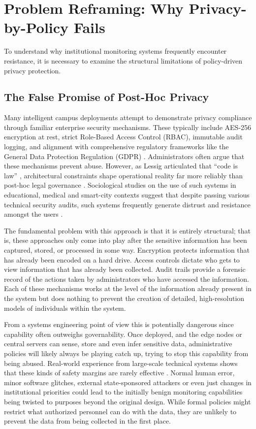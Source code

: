 \documentclass[conference]{IEEEtran}
\begin{document}
\section{Problem Reframing: Why Privacy-by-Policy Fails}

To understand why institutional monitoring systems frequently encounter resistance, it is necessary to examine the structural limitations of policy-driven privacy protection.

\subsection{The False Promise of Post-Hoc Privacy}
Many intelligent campus deployments attempt to demonstrate privacy compliance through familiar enterprise security mechanisms. These typically include AES-256 encryption at rest, strict Role-Based Access Control (RBAC), immutable audit logging, and alignment with comprehensive regulatory frameworks like the General Data Protection Regulation (GDPR) \cite{b25}. Administrators often argue that these mechanisms prevent abuse. However, as Lessig articulated that ``code is law'' \cite{b27}, architectural constraints shape operational reality far more reliably than post-hoc legal governance \cite{b24}. Sociological studies on the use of such systems in educational, medical and smart-city contexts suggest that despite passing various technical security audits, such systems frequently generate distrust and resistance amongst the users \cite{b5}.

The fundamental problem with this approach is that it is entirely structural; that is, these approaches only come into play after the sensitive information has been captured, stored, or processed in some way. Encryption protects information that has already been encoded on a hard drive. Access controls dictate who gets to view information that has already been collected. Audit trails provide a forensic record of the actions taken by administrators who have accessed the information. Each of these mechanisms works at the level of the information already present in the system but does nothing to prevent the creation of detailed, high-resolution models of individuals within the system.

From a systems engineering point of view this is potentially dangerous since capability often outweighs governability. Once deployed, and the edge nodes or central servers can sense, store and even infer sensitive data, administrative policies will likely always be playing catch up, trying to stop this capability from being abused. Real-world experience from large-scale technical systems shows that these kinds of safety margins are rarely effective \cite{b4}. Normal human error, minor software glitches, external state-sponsored attackers or even just changes in institutional priorities could lead to the initially benign monitoring capabilities being twisted to purposes beyond the original design. While formal policies might restrict what authorized personnel can do with the data, they are unlikely to prevent the data from being collected in the first place.
\end{document}
